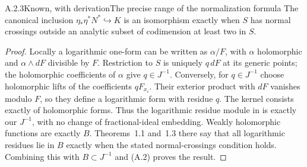 
\begin{statement}{A.2.3}{Known, with derivation}{The precise range of the normalization formula}
The canonical inclusion $\eta_*\eta^*N^*\hookrightarrow K$ is an isomorphism exactly when $S$ has normal crossings outside an analytic subset of codimension at least two in $S$.
\end{statement}
\begin{proof}
Locally a logarithmic one-form can be written as $\alpha/F$, with $\alpha$ holomorphic and $\alpha\wedge dF$ divisible by $F$. Restriction to $S$ is uniquely $q\,dF$ at its generic points; the holomorphic coefficients of $\alpha$ give $q\in J^{-1}$. Conversely, for $q\in J^{-1}$ choose holomorphic lifts of the coefficients $qF_{x_i}$. Their exterior product with $dF$ vanishes modulo $F$, so they define a logarithmic form with residue $q$. The kernel consists exactly of holomorphic forms. Thus the logarithmic residue module in \cite[Proposition~3.4]{GS2014} is exactly our $J^{-1}$, with no change of fractional-ideal embedding. Weakly holomorphic functions are exactly $B$. Theorems~1.1 and~1.3 there say that all logarithmic residues lie in $B$ exactly when the stated normal-crossings condition holds. Combining this with $B\subset J^{-1}$ and (A.2) proves the result.
\end{proof}



